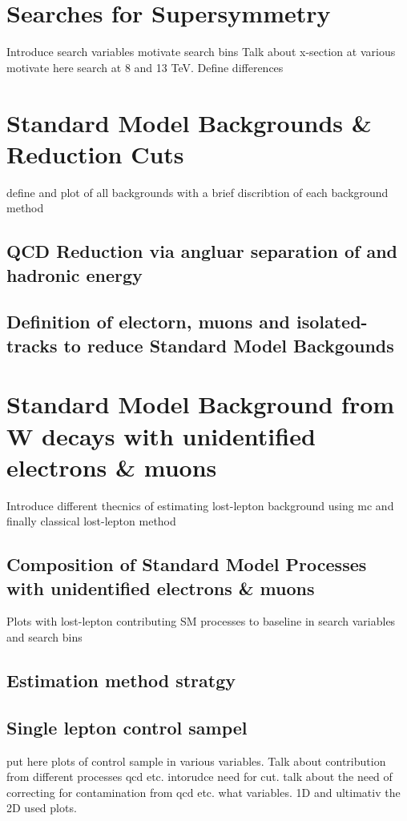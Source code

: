 \chapter{Searches for Supersymmetry}
\label{sec:SUSY_Search_Intro}
\todo Introduce search variables motivate search bins
\todo Talk about x-section at various \CM motivate here search at 8 and 13 TeV. Define differences

\chapter{Standard Model Backgrounds \& Reduction Cuts}
\label{sec:SM_BackGrounds}
\todo define and plot of all backgrounds with a brief discribtion of each background method
\section{QCD Reduction via angluar separation of \met and hadronic energy}

\section{Definition of electorn, muons and isolated-tracks to reduce Standard Model Backgounds}
\label{sec:Lepton_Definition_Study}

\chapter{Standard Model Background from W decays with unidentified electrons \& muons}
\label{sec:Lost_Lepton_Main}
\todo Introduce different thecnics of estimating lost-lepton background using mc and finally classical lost-lepton method
\section{Composition of Standard Model Processes with unidentified electrons \& muons}
\label{sec:Lost_Lepton_Composition}
\todo Plots with lost-lepton contributing SM processes to baseline in search variables and search bins

\section{Estimation method stratgy}


\section{Single lepton control sampel}
\label{sec:Lost_Lepton_CS}
\todo put here plots of control sample in various variables. Talk about contribution from different processes qcd etc. intorudce need for \mt cut.
talk about the need of correcting for contamination from qcd etc. what variables. 1D and ultimativ the 2D used plots.

